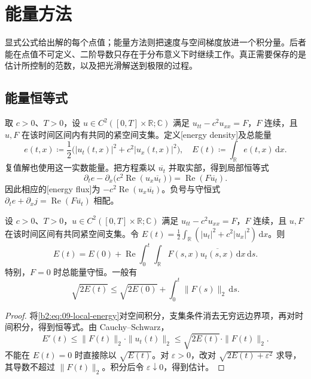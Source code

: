 \section{能量方法}
\label{b2:sec:0903}

显式公式给出解的每个点值；能量方法则把速度与空间梯度放进一个积分量。后者能在点值不可定义、二阶导数只存在于分布意义下时继续工作。真正需要保存的是估计所控制的范数，以及把光滑解送到极限的过程。

\subsection{能量恒等式}
\label{b2:subsec:090301}

取 \(c>0\)、\(T>0\)，设 \(u\in C^2([0,T]\times\mathbb R;\mathbb C)\) 满足 \(u_{tt}-c^2u_{xx}=F\)，\(F\) 连续，且 \(u,F\) 在该时间区间内有共同的紧空间支集。定义[energy density]及总能量
\[
 e(t,x)\coloneqq\dfrac12\bigl(|u_t(t,x)|^2+c^2|u_x(t,x)|^2\bigr),\quad
 E(t)\coloneqq\int_{\mathbb R}e(t,x)\,\mathrm{d}x.
\]
复值解也使用这一实数能量。把方程乘以 \(\overline{u_t}\) 并取实部，得到局部恒等式
\begin{equation}\label{b2:eq:09-local-energy}
 \partial_te-\partial_x\bigl(c^2\operatorname{Re}(u_x\overline{u_t})\bigr)
 =\operatorname{Re}(F\overline{u_t}).
\end{equation}
因此相应的[energy flux]为 \(-c^2\operatorname{Re}(u_x\overline{u_t})\)。负号与守恒式 \(\partial_te+\partial_xj=\operatorname{Re}(F\overline{u_t})\) 相配。

\begin{proposition}[能量与外力功]\label{b2:prop:09-energy}
设 \(c>0\)、\(T>0\)，\(u\in C^2([0,T]\times\mathbb R;\mathbb C)\) 满足 \(u_{tt}-c^2u_{xx}=F\)，\(F\) 连续，且 \(u,F\) 在该时间区间有共同紧空间支集。令 \(E(t)=\frac12\int_{\mathbb R}(|u_t|^2+c^2|u_x|^2)\,\mathrm dx\)。则
\begin{equation}\label{b2:eq:09-energy-identity}
 E(t)=E(0)+\operatorname{Re}\int_0^t\int_{\mathbb R}
 F(s,x)\overline{u_t(s,x)}\,\mathrm{d}x\,\mathrm{d}s.
\end{equation}
特别，\(F=0\) 时总能量守恒。一般有
\begin{equation}\label{b2:eq:09-energy-bound}
 \sqrt{2E(t)}\leq\sqrt{2E(0)}+\int_0^t\|F(s)\|_2\,\mathrm{d}s.
\end{equation}
\end{proposition}
\begin{proof}
将\eqref{b2:eq:09-local-energy}对空间积分，支集条件消去无穷远边界项，再对时间积分，得到恒等式。由 Cauchy--Schwarz，
\[
 E'(t)\leq\|F(t)\|_2\cdot\|u_t(t)\|_2
 \leq\sqrt{2E(t)}\cdot\|F(t)\|_2.
\]
不能在 \(E(t)=0\) 时直接除以 \(\sqrt{E(t)}\)。对 \(\varepsilon>0\)，改对 \(\sqrt{2E(t)+\varepsilon^2}\) 求导，其导数不超过 \(\|F(t)\|_2\)。积分后令 \(\varepsilon\downarrow0\)，得到估计。
\end{proof}

